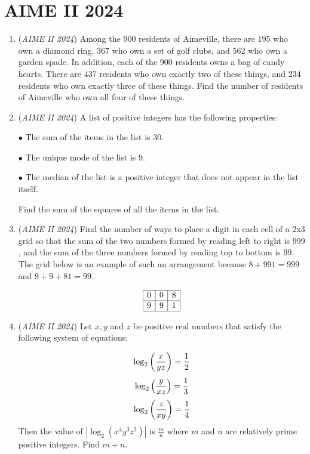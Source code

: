 \section{AIME II 2024}
        \begin{enumerate}
        	\item (\textit{AIME II 2024}) Among the $900$ residents of Aimeville, there are $195$ who own a diamond ring, $367$ who own a set of golf clubs, and $562$ who own a garden spade. In addition, each of the $900$ residents owns a bag of candy hearts. There are $437$ residents who own exactly two of these things, and $234$ residents who own exactly three of these things. Find the number of residents of Aimeville who own all four of these things.


 

	\item (\textit{AIME II 2024}) A list of positive integers has the following properties:


 $\bullet$ The sum of the items in the list is $30$.


 $\bullet$ The unique mode of the list is $9$.


 $\bullet$ The median of the list is a positive integer that does not appear in the list itself.


 Find the sum of the squares of all the items in the list.


 

	\item (\textit{AIME II 2024}) Find the number of ways to place a digit in each cell of a 2x3 grid so that the sum of the two numbers formed by reading left to right is $999$, and the sum of the three numbers formed by reading top to bottom is $99$. The grid below is an example of such an arrangement because $8+991=999$ and $9+9+81=99$.


 
 \[\begin{array}{|c|c|c|} \hline 0 & 0 & 8 \\ \hline 9 & 9 & 1 \\ \hline \end{array}\]


	\item (\textit{AIME II 2024}) Let $x,y$ and $z$ be positive real numbers that satisfy the following system of equations:

 \[\log_2\left({x \over yz}\right) = {1 \over 2}\]
 \[\log_2\left({y \over xz}\right) = {1 \over 3}\]
 \[\log_2\left({z \over xy}\right) = {1 \over 4}\]
Then the value of $\left|\log_2(x^4y^3z^2)\right|$ is $\frac{m}{n}$ where $m$ and $n$ are relatively prime positive integers. Find $m+n$.



\end{enumerate}
